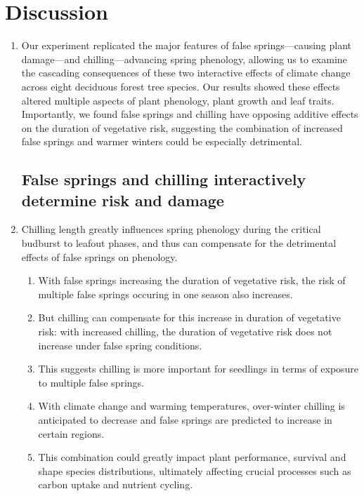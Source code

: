 \documentclass{article}\usepackage[]{graphicx}\usepackage[]{color}
\begin{document}
\section*{Discussion} 
\begin{enumerate}
\item Our experiment replicated the major features of false springs---causing plant damage---and chilling---advancing spring phenology, allowing us to examine the cascading consequences of these two interactive effects of climate change across eight deciduous forest tree species. Our results showed these effects altered multiple aspects of plant phenology, plant growth and leaf traits. Importantly, we found false springs and chilling have opposing additive effects on the duration of vegetative risk, suggesting the combination of increased false springs and warmer winters could be especially detrimental.

\subsection*{False springs and chilling interactively determine risk and damage}
\item Chilling length greatly influences spring phenology during the critical budburst to leafout phases, and thus can compensate for the detrimental effects of false springs on phenology.
  \begin{enumerate}
  \item With false springs increasing the duration of vegetative risk, the risk of multiple false springs occuring in one season also increases. 
  \item But chilling can compensate for this increase in duration of vegetative risk: with increased chilling, the duration of vegetative risk does not increase under false spring conditions.
  \item This suggests chilling is more important for seedlings in terms of exposure to multiple false springs.
  \item With climate change and warming temperatures, over-winter chilling is anticipated to decrease and false springs are predicted to increase in certain regions.
  \item This combination could greatly impact plant performance, survival and shape species distributions, ultimately affecting crucial processes such as carbon uptake and nutrient cycling.
  \end{enumerate}
  

\end{enumerate}
\end{document}
